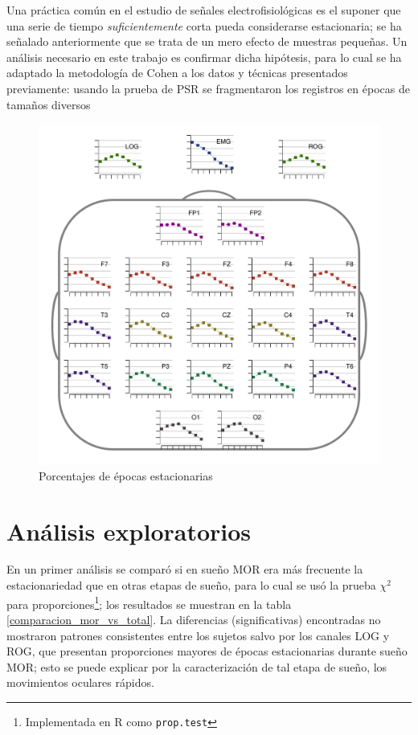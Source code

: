 Una práctica común en el estudio de señales electrofisiológicas es el suponer que una serie de 
tiempo \textit{suficientemente} corta pueda considerarse estacionaria; se ha señalado anteriormente
\cite{Melard89} que se trata de un mero efecto de muestras pequeñas.
Un análisis necesario en este trabajo es confirmar dicha hipótesis, para lo cual se ha adaptado la
metodología de Cohen \cite{Cohen77} a los datos y técnicas presentados previamente: usando la prueba
de PSR se fragmentaron los registros en épocas de tamaños diversos

\begin{figure}
\centering
\includegraphics[width=\linewidth]{./img_resultados/VCNNS1_cabeza_epocas_.pdf}
\caption{Porcentajes de épocas estacionarias}
\end{figure}

\section{Análisis exploratorios}

En un primer análisis se comparó si en sueño MOR era más frecuente la estacionariedad que en otras
etapas de sueño, para lo cual se usó la prueba $\chi^{2}$ para proporciones\footnote{Implementada 
en R como \texttt{prop.test}};
los resultados se muestran en la tabla \ref{comparacion_mor_vs_total}.
La diferencias (significativas) encontradas no mostraron patrones consistentes entre los sujetos
salvo por los canales LOG y ROG, que presentan proporciones mayores de épocas estacionarias
durante sueño MOR; esto se puede explicar por la caracterización de tal etapa de sueño, los
movimientos oculares rápidos.

